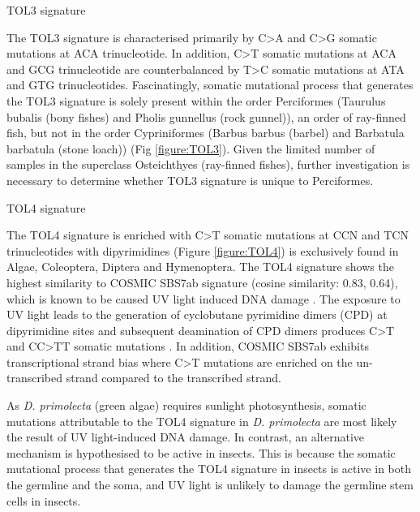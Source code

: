 \begin{description}
    \item[TOL3 signature]
\end{description}

The TOL3 signature is characterised primarily by C>A and C>G somatic mutations at ACA trinucleotide. In addition, C>T somatic mutations at ACA and GCG trinucleotide are counterbalanced by T>C somatic mutations at ATA and GTG trinucleotides. Fascinatingly, somatic mutational process that generates the TOL3 signature is solely present within the order Perciformes (Taurulus bubalis (bony fishes) and Pholis gunnellus (rock gunnel)), an order of ray-finned fish, but not in the order Cypriniformes (Barbus barbus (barbel) and Barbatula barbatula (stone loach)) (Fig \ref{figure:TOL3}). Given the limited number of samples in the superclass Osteichthyes (ray-finned fishes), further investigation is necessary to determine whether TOL3 signature is unique to Perciformes. 

\begin{description}
    \item[TOL4 signature]
\end{description}

The TOL4 signature is enriched with C>T somatic mutations at CCN and TCN trinucleotides with dipyrimidines (Figure \ref{figure:TOL4}) is exclusively found in Algae, Coleoptera, Diptera and Hymenoptera. The TOL4 signature shows the highest similarity to COSMIC SBS7ab signature (cosine similarity: 0.83, 0.64), which is known to be caused UV light induced DNA damage \cite{Nik-Zainal2015-bj}. The exposure to UV light leads to the generation of cyclobutane pyrimidine dimers (CPD) at dipyrimidine sites and subsequent deamination of CPD dimers produces C>T and CC>TT somatic mutations \cite{Jin2021-ae}. In addition, COSMIC SBS7ab exhibits transcriptional strand bias where C>T mutations are enriched on the un-transcribed strand compared to the transcribed strand. 

As \textit{D. primolecta} (green algae) requires sunlight photosynthesis, somatic mutations attributable to the TOL4 signature in \textit{D. primolecta} are most likely the result of UV light-induced DNA damage. In contrast, an alternative mechanism is hypothesised to be active in insects. This is because the somatic mutational process that generates the TOL4 signature in insects is active in both the germline and the soma, and UV light is unlikely to damage the germline stem cells in insects.

